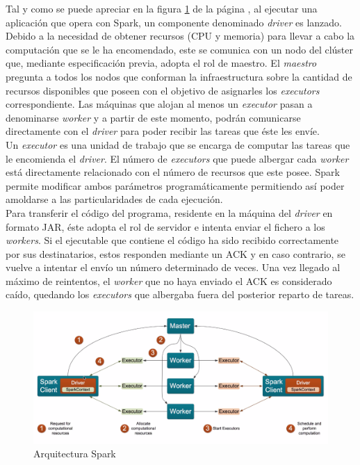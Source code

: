 Tal y como se puede apreciar en la figura \ref{fig:spark_initialization} de la página \pageref{fig:spark_initialization}, al ejecutar una aplicación que opera con Spark, un componente denominado \textit{driver} es lanzado. Debido a la necesidad de obtener recursos (CPU y memoria) para llevar a cabo la computación que se le ha encomendado, este se comunica con un nodo del clúster que, mediante especificación previa, adopta el rol de maestro. El \textit{maestro} pregunta a todos los nodos que conforman la infraestructura sobre la cantidad de recursos disponibles que poseen con el objetivo de asignarles los \textit{executors} correspondiente. Las máquinas que alojan al menos un \textit{executor} pasan a denominarse \textit{worker} y a partir de este momento, podrán comunicarse directamente con el \textit{driver} para poder recibir las tareas que éste les envíe.\\

Un \textit{executor} es una unidad de trabajo que se encarga de computar las tareas que le encomienda el \textit{driver}. El número de \textit{executors} que puede albergar cada \textit{worker} está directamente relacionado con el número de recursos que este posee. Spark permite modificar ambos parámetros programáticamente permitiendo así poder amoldarse a las particularidades de cada ejecución.\\

Para transferir el código del programa, residente en la máquina del \textit{driver} en formato JAR, éste adopta  el rol de servidor e intenta enviar el fichero a los \textit{workers}. Si el ejecutable que contiene el código ha sido recibido correctamente por sus destinatarios, estos responden mediante un ACK y en caso contrario, se vuelve a intentar el envío un número determinado de veces. Una vez llegado al máximo de reintentos, el \textit{worker} que no haya enviado el ACK es considerado caído, quedando los \textit{executors} que albergaba fuera del posterior reparto de tareas.

\begin{figure}[h]
	\centering
	\includegraphics[width=1\textwidth]{Ilustraciones/spark_architecture.png}
	\caption{Arquitectura Spark}
	\label{fig:spark_initialization}
\end{figure}

